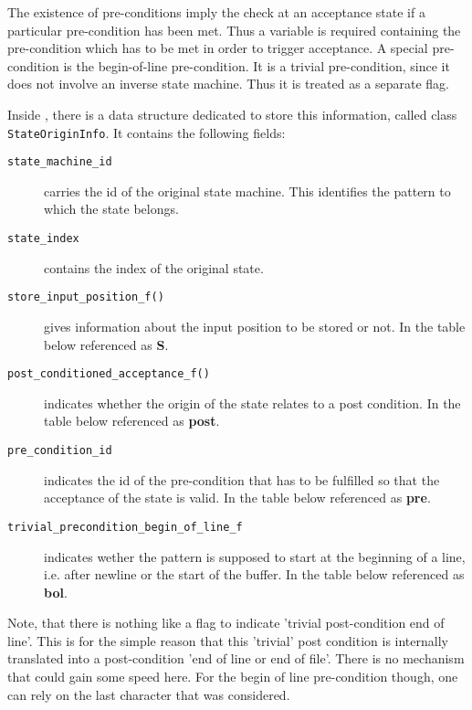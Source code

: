 The existence of pre-conditions imply the check at an acceptance state
if a particular pre-condition has been met. Thus a variable is required
containing the pre-condition which has to be met in order to trigger acceptance.
A special pre-condition is the begin-of-line pre-condition. It is a trivial 
pre-condition, since it does not involve an inverse state machine. Thus
it is treated as a separate flag.

Inside {\Quex}, there is a data structure dedicated to store
this information, called class {\tt StateOriginInfo}. It contains
the following fields:

\begin{description}

\item [\tt state\_machine\_id] carries the id of the original state machine. 
      This identifies the pattern to which the state belongs.

\item [\tt state\_index] contains the index of the original state.

\item [\tt store\_input\_position\_f()] gives information about the input
      position to be stored or not. In the table below referenced as {\bf S}.

\item [\tt post\_conditioned\_acceptance\_f()] indicates whether the origin of the 
      state relates to a post condition. In the table below referenced as {\bf post}.

\item [\tt pre\_condition\_id] indicates the id of the pre-condition that has to be fulfilled
      so that the acceptance of the state is valid. In the table below referenced as {\bf pre}.

\item [\tt trivial\_precondition\_begin\_of\_line\_f] indicates wether the pattern
      is supposed to start at the beginning of a line, i.e. after newline or the
      start of the buffer. In the table below referenced as {\bf bol}.
\end{description}

Note, that there is nothing like a flag to indicate 'trivial post-condition end of line'.
This is for the simple reason that this 'trivial' post condition is internally translated
into a post-condition 'end of line or end of file'. There is no mechanism that could
gain some speed here. For the begin of line pre-condition though, one can rely on the
last character that was considered. 

